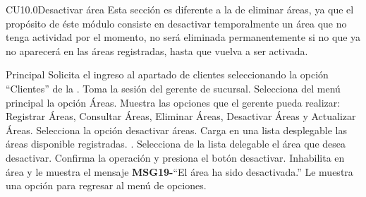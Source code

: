 

	\begin{UseCase}{CU10.0}{Desactivar área}{
		Esta sección es diferente a la de eliminar áreas, ya que el propósito de éste módulo consiste en desactivar temporalmente un área que no tenga actividad por el momento, no será eliminada permanentemente si no que ya no aparecerá en las áreas registradas, hasta que vuelva a ser activada.
	}
	\end{UseCase}

\begin{UCtrayectoria}{Principal}
		\UCpaso[\UCactor] Solicita el ingreso al apartado de clientes seleccionando la opción ``Clientes'' de la .
		\UCpaso Toma la sesión del gerente de sucursal.
		\UCpaso[\UCactor] Selecciona del menú principal la opción Áreas.
		\UCpaso Muestra las opciones que el gerente pueda realizar: Registrar Áreas, Consultar Áreas, Eliminar Áreas, Desactivar Áreas y Actualizar Áreas.
		\UCpaso[\UCactor] Selecciona la opción desactivar áreas.
		\UCpaso Carga en una lista desplegable las áreas disponible registradas. .
		\UCpaso[\UCactor] Selecciona de la lista delegable el área que desea desactivar.
		\UCpaso[\UCactor] Confirma la operación y presiona el botón desactivar.
		\UCpaso Inhabilita en área y le muestra el mensaje {\bf MSG19-}``El área ha sido desactivada.''
		\UCpaso Le muestra una opción para regresar al menú de opciones.
	\end{UCtrayectoria}

